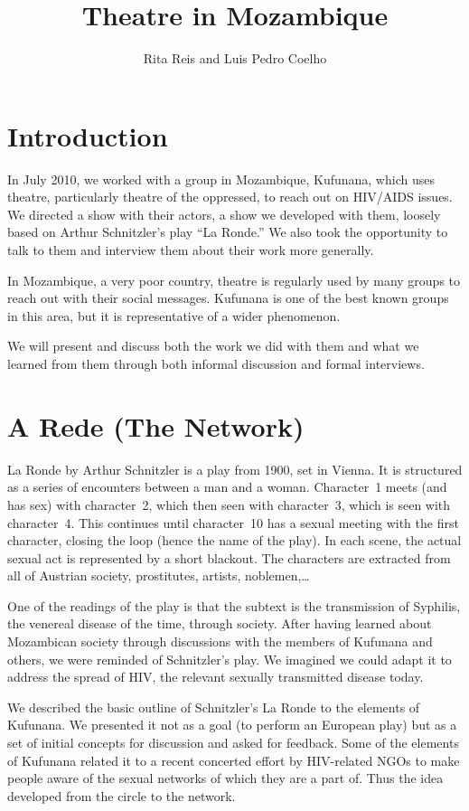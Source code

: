 \documentclass[article,twocolumn,twoside]{memoir}
\title{Theatre in Mozambique}
\author{Rita Reis and Luis Pedro Coelho}
\begin{document}
\maketitle

\chapter{Introduction}
In July 2010, we worked with a group in Mozambique, Kufunana, which uses
theatre, particularly theatre of the oppressed, to reach out on HIV/AIDS
issues. We directed a show with their actors, a show we developed with them,
loosely based on Arthur Schnitzler's play ``La Ronde.'' We also took the
opportunity to talk to them and interview them about their work more generally.

In Mozambique, a very poor country, theatre is regularly used by many groups to
reach out with their social messages. Kufunana is one of the best known groups
in this area, but it is representative of a wider phenomenon.

We will present and discuss both the work we did with them and what we learned
from them through both informal discussion and formal interviews.

\chapter{A Rede (The Network)}
La Ronde by Arthur Schnitzler is a play from 1900, set in Vienna. It is
structured as a series of encounters between a man and a woman. Character~1
meets (and has sex) with character~2, which then seen with character~3, which
is seen with character~4. This continues until character~10 has a sexual
meeting with the first character, closing the loop (hence the name of the
play). In each scene, the actual sexual act is represented by a short blackout.
The characters are extracted from all of Austrian society, prostitutes,
artists, noblemen,\ldots

One of the readings of the play is that the subtext is the transmission of
Syphilis, the venereal disease of the time, through society. After having
learned about Mozambican society through discussions with the members of
Kufunana and others, we were reminded of Schnitzler's play. We imagined we
could adapt it to address the spread of HIV, the relevant sexually transmitted
disease today.

We described the basic outline of Schnitzler's La Ronde to the elements of
Kufunana. We presented it not as a goal (to perform an European play) but as a
set of initial concepts for discussion and asked for feedback. Some of the
elements of Kufunana related it to a recent concerted effort by HIV-related
NGOs to make people aware of the sexual networks of which they are a part of.
Thus the idea developed from the circle to the network.
\end{document}
